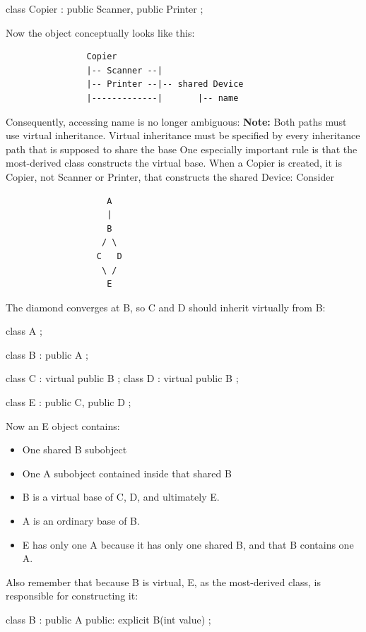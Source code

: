 \documentclass{report}
\begin{document}
\begin{itemize}
\begin{cppcode}
                class Copier : public Scanner, public Printer {};
            \end{cppcode}
            \bigbreak \noindent 
            Now the object conceptually looks like this:
            \begin{verbatim}
                Copier
                |-- Scanner --|
                |-- Printer --|-- shared Device
                |-------------|       |-- name
            \end{verbatim}
            \bigbreak \noindent 
            Consequently, accessing name is no longer ambiguous:
            \bigbreak \noindent 
            \textbf{Note:} Both paths must use virtual inheritance. Virtual inheritance must be specified by every inheritance path that is supposed to share the base
            \bigbreak \noindent 
            One especially important rule is that the most-derived class constructs the virtual base.
            \bigbreak \noindent 
            When a Copier is created, it is Copier, not Scanner or Printer, that constructs the shared Device:
            \bigbreak \noindent 
            Consider 
            \begin{verbatim}
                    A
                    |
                    B
                   / \
                  C   D
                   \ /
                    E
            \end{verbatim}
            \bigbreak \noindent 
            The diamond converges at B, so C and D should inherit virtually from B:
            \bigbreak \noindent 
            \begin{cppcode}
            class A {};

            class B : public A {};

            class C : virtual public B {};
            class D : virtual public B {};

            class E : public C, public D {};
            \end{cppcode}
            \bigbreak \noindent 
            Now an E object contains:
            \begin{itemize}
                \item One shared B subobject
                \item One A subobject contained inside that shared B
            \end{itemize}
            \begin{itemize}
                \item B is a virtual base of C, D, and ultimately E.
                \item A is an ordinary base of B.
                \item E has only one A because it has only one shared B, and that B contains one A.
            \end{itemize}
            Also remember that because B is virtual, E, as the most-derived class, is responsible for constructing it:
            \bigbreak \noindent 
            \begin{cppcode}
                class B : public A {
                    public:
                    explicit B(int value) {}
                };


\end{cppcode}
\end{itemize}
\end{document}
